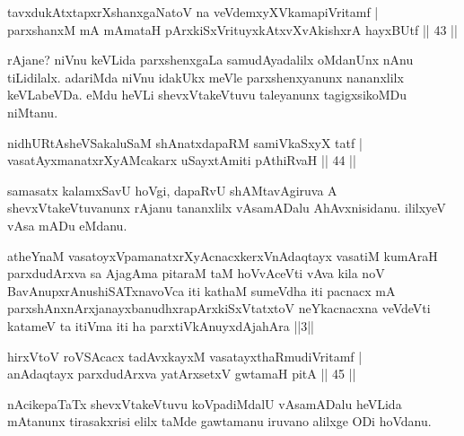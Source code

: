 \begin{shl}
tavxdukAtxtapxrXshanxgaNatoV na veVdemxyXVkamapiVritamf | \\
parxshanxM mA mAmataH pArxkiSxVrituyxkAtxvX\s vAkishxrA hayxBUtf \hfill|| 43 || 
\end{shl}

\begin{artha}
rAjane? niVnu keVLida parxshenxgaLa samudAyadalilx oMdanUnx nAnu 
tiLidilalx. adariMda niVnu idakUkx meVle parxshenxyanunx nananxlilx 
keVLabeVDa. eMdu heVLi shevxVtakeVtuvu taleyanunx tagigxsikoMDu 
niMtanu.
\end{artha}


\begin{shl}
nidhURtAsheVSakaluSaM shAnatxdapaRM samiVkaSxyX tatf | \\
vasatAyx\s \s manatxrXyAMcakarx uSayxtAmiti pAthiRvaH \hfill|| 44 || 
\end{shl}

\begin{artha}
samasatx kalamxSavU hoVgi, dapaRvU shAMtavAgiruva A 
shevxVtakeVtuvanunx rAjanu tananxlilx vAsamADalu AhAvxnisidanu. 
ililxyeV vAsa mADu eMdanu.
\end{artha}


\begin{shl}
atheYnaM vasatoyxVpamanatxrXyAcnacxkerxV\s nAdaqtayx vasatiM kumAraH parxdudArxva sa AjagAma pitaraM taM hoVvAceVti vAva kila noV BavAnupxrAnushiSATxnavoVca iti kathaM sumeVdha iti pacnacx mA parxshAnxnArxjanayxbanudhxrapArxkiSxVtatxtoV neYkacnacxna veVdeVti katameV ta itiVma iti ha parxtiVkAnuyxdAjahAra ||3||
\end{shl}


\begin{shl}
hirxVtoV roVSAcacx tadAvxkayxM vasatayxthaRmudiVritamf | \\
anAdaqtayx parxdudArxva yatArx\s \s setxV gwtamaH pitA \hfill|| 45 || 
\end{shl}

\begin{artha}
nAcikepaTaTx shevxVtakeVtuvu koVpadiMdalU vAsamADalu heVLida mAtanunx 
tirasakxrisi elilx taMde gawtamanu iruvano alilxge ODi hoVdanu.
\end{artha}

